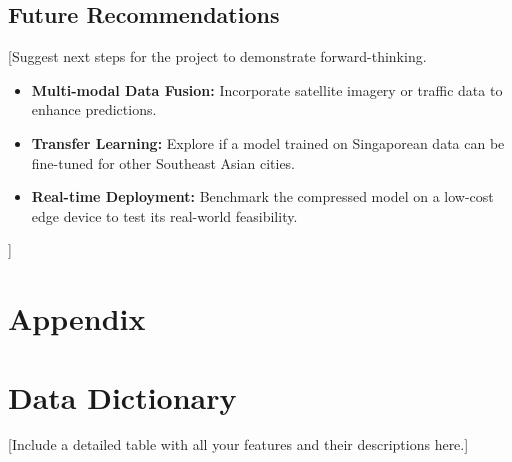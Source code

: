 \documentclass[11pt, a4paper]{article}
\begin{document}
\subsection{Future Recommendations}
[Suggest next steps for the project to demonstrate forward-thinking.
\begin{itemize}
    \item \textbf{Multi-modal Data Fusion:} Incorporate satellite imagery or traffic data to enhance predictions.
    \item \textbf{Transfer Learning:} Explore if a model trained on Singaporean data can be fine-tuned for other Southeast Asian cities.
    \item \textbf{Real-time Deployment:} Benchmark the compressed model on a low-cost edge device to test its real-world feasibility.
\end{itemize}]

\begin{appendix}
\section*{Appendix}
\section{Data Dictionary}
[Include a detailed table with all your features and their descriptions here.]
\end{appendix}



\end{document}
